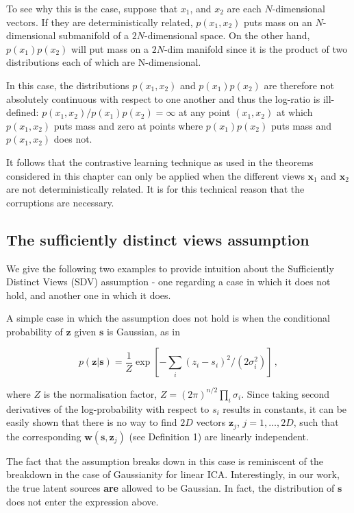 To see why this is the case, suppose that $x_1$, and $x_2$ are each $N$-dimensional vectors.
If they are deterministically related, $p(x_1, x_2)$ puts mass on an $N$-dimensional submanifold of a $2N$-dimensional space.
On the other hand, $p(x_1)p(x_2)$ will put mass on a $2N$-dim manifold since it is the product of two distributions each of which are N-dimensional.

In this case, the distributions $p(x_1, x_2)$ and $p(x_1)p(x_2)$ are therefore not absolutely continuous with respect to one another and thus the log-ratio is ill-defined: $p(x_1, x_2)/p(x_1)p(x_2) = \infty$ at any point $(x_1,x_2)$ at which $p(x_1, x_2)$ puts mass and zero at points where $p(x_1)p(x_2)$ puts mass and $p(x_1,x_2)$ does not.

It follows that the contrastive learning technique as used in the theorems considered in this chapter can only be applied when the different views $\bm{x}_1$ and $\bm{x}_2$ are not deterministically related.
It is for this technical reason that the corruptions are necessary.


\subsection{The sufficiently distinct views assumption}
\label{appendix:sdv}

We give the following two examples to provide intuition about the Sufficiently Distinct Views (SDV) assumption - one regarding a case in which it does not hold, and another one in which it does.


A simple case in which the assumption does not hold is when the conditional probability of $\bm{z}$ given $\bm{s}$ is Gaussian, as in

\begin{equation}
p(\bm{z}|\bm{s}) = \frac{1}{Z} \exp\left[ -\sum_i (z_i - s_i)^2/(2\sigma_i^2) \right]\,, \label{eq:unsatisfied}
\end{equation}

where $Z$ is the normalisation factor, $Z = (2\pi)^{n/2}  \prod_i \sigma_i$.
Since taking second derivatives of the log-probability with respect to $s_i$ results in constants,
it can be easily shown that there is no way to find $2D$ vectors $\bm{z}_j$, $j=1, \ldots, 2D$, such that the corresponding $\bm{w}(\bm{s}, \bm{z}_j)$ (see Definition 1) are linearly independent.


The fact that the assumption breaks down in this case is reminiscent of the breakdown in the case of Gaussianity for linear ICA. Interestingly, in our work, the true latent sources \textbf{are} allowed to be Gaussian. In fact, the distribution of $\bm{s}$ does not enter the expression above.



